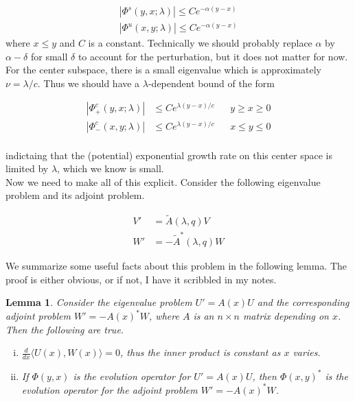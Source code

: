 \documentclass[12pt]{article}
\newtheorem{lemma}{Lemma}
\begin{document}
\begin{align*}
|\Phi^s(y, x; \lambda)| \leq C e^{-\alpha(y-x)} \\
|\Phi^u(x, y; \lambda)| \leq C e^{-\alpha(y-x)}
\end{align*}
where $x \leq y$ and $C$ is a constant. Technically we should probably replace $\alpha$ by $\alpha - \delta$ for small $\delta$ to account for the perturbation, but it does not matter for now.\\

For the center subspace, there is a small eigenvalue which is approximately $\nu = \lambda / c$. Thus we should have a $\lambda$-dependent bound of the form

\begin{align*}
|\Phi^c_+(y, x; \lambda)| &\leq C e^{\lambda(y-x)/c} && y \geq x \geq 0 \\
|\Phi^c_-(x, y; \lambda)| &\leq C e^{\lambda(y-x)/c} && x \leq y \leq 0 \\
\end{align*}

indictaing that the (potential) exponential growth rate on this center space is limited by $\lambda$, which we know is small.\\

Now we need to make all of this explicit. Consider the following eigenvalue problem and its adjoint problem.

\begin{align}
V' &= \tilde{A}(\lambda, q)V \label{eig:V} \\
W' &= -\tilde{A}^*(\lambda, q)W \label{eig:W}
\end{align}

We summarize some useful facts about this problem in the following lemma. The proof is either obvious, or if not, I have it scribbled in my notes.

\begin{lemma}\label{eigadjoint}
Consider the eigenvalue problem $U' = A(x)U$ and the corresponding adjoint problem $W' = -A(x)^* W$, where $A$ is an $n \times n$ matrix depending on $x$. Then the following are true.
\begin{enumerate}[(i)]
\item $\frac{d}{dx}\langle U(x), W(x) \rangle = 0$, thus the inner product is constant as $x$ varies.
\item If $\Phi(y, x)$ is the evolution operator for $U' = A(x)U$, then $\Phi(x, y)^*$ is the evolution operator for the adjoint problem $W' = -A(x)^* W$.
\end{enumerate}
\end{lemma}
\end{document}
